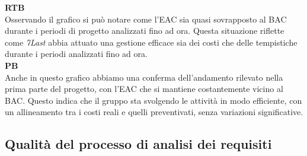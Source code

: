 \textbf{RTB} \\
Osservando il grafico si può notare come l'EAC sia quasi sovrapposto al BAC durante i periodi di progetto analizzati fino ad ora. Questa situazione riflette come \textit{7Last} abbia attuato una gestione efficace sia dei costi che delle tempistiche durante i periodi analizzati fino ad ora. \\

\textbf{PB} \\
Anche in questo grafico abbiamo una conferma dell'andamento rilevato nella prima parte del progetto, con l'EAC che si mantiene costantemente vicino al BAC. Questo indica che il gruppo sta svolgendo le attività in modo efficiente, con un allineamento tra i costi reali e quelli preventivati, senza variazioni significative.

\newpage
\subsection{Qualità del processo di analisi dei requisiti}
